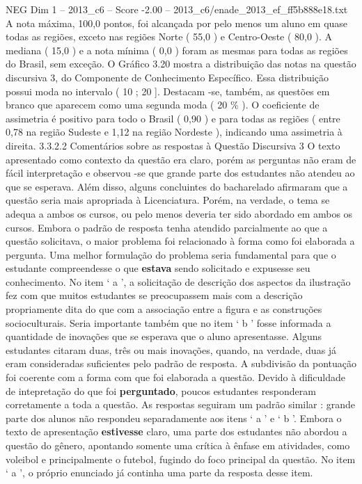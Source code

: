 \begin{textsample}{NEG Dim 1 – 2013\_c6 – Score -2.00 – 2013\_c6/enade\_2013\_ef\_ff5b888e18.txt}
A nota máxima, 100,0 pontos, foi alcançada por pelo menos um aluno em quase todas as regiões, exceto nas regiões Norte ( 55,0 ) e Centro-Oeste ( 80,0 ).
A mediana ( 15,0 ) e a nota mínima ( 0,0 ) foram as mesmas para todas as regiões do Brasil, sem exceção.
O Gráfico 3.20 mostra a distribuição das notas na questão discursiva 3, do Componente de Conhecimento Específico.
Essa distribuição possui moda no intervalo ( 10 ; 20 ].
Destacam -se, também, as questões em branco que aparecem como uma segunda moda ( 20 \% ).
O coeficiente de assimetria é positivo para todo o Brasil ( 0,90 ) e para todas as regiões ( entre 0,78 na região Sudeste e 1,12 na região Nordeste ), indicando uma assimetria à direita. 3.3.2.2 Comentários sobre as respostas à Questão Discursiva 3 O texto apresentado como contexto da questão era claro, porém as perguntas não eram de fácil interpretação e observou -se que grande parte dos estudantes não atendeu ao que se esperava.
Além disso, alguns concluintes do bacharelado afirmaram que a questão seria mais apropriada à Licenciatura.
Porém, na verdade, o tema se adequa a ambos os cursos, ou pelo menos deveria ter sido abordado em ambos os cursos.
Embora o padrão de resposta tenha atendido parcialmente ao que a questão solicitava, o maior problema foi relacionado à forma como foi elaborada a pergunta.
Uma melhor formulação do problema seria fundamental para que o estudante compreendesse o que \textbf{estava} sendo solicitado e expusesse seu conhecimento.
No item ‘ a ’, a solicitação de descrição dos aspectos da ilustração fez com que muitos estudantes se preocupassem mais com a descrição propriamente dita do que com a associação entre a figura e as construções socioculturais.
Seria importante também que no item ‘ b ’ fosse informada a quantidade de inovações que se esperava que o aluno apresentasse.
Alguns estudantes citaram duas, três ou mais inovações, quando, na verdade, duas já eram consideradas suficientes pelo padrão de resposta.
A subdivisão da pontuação foi coerente com a forma com que foi elaborada a questão.
Devido à dificuldade de intepretação do que foi \textbf{perguntado}, poucos estudantes responderam corretamente a toda a questão.
As respostas seguiram um padrão similar : grande parte dos alunos não respondeu separadamente aos itens ‘ a ’ e ‘ b ’.
Embora o texto de apresentação \textbf{estivesse} claro, uma parte dos estudantes não abordou a questão do gênero, apontando somente uma crítica à ênfase em atividades, como voleibol e principalmente o futebol, fugindo do foco principal da questão.
No item ‘ a ’, o próprio enunciado já continha uma parte da resposta desse item.

\end{textsample}
